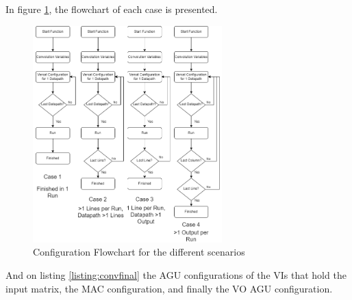 In figure \ref{ConvFlowChart}, the flowchart of each case is presented.

\newpage
\begin{figure}[!htbp]
    \centering
    \includegraphics[width=0.65\textwidth]{Figures/ConvolutionFlowChart.drawio.png}
    \caption{Configuration Flowchart for the different scenarios}
    \label{ConvFlowChart}
\end{figure} 

And on listing \ref{listing:convfinal} the AGU configurations of the VIs that hold the input matrix, the MAC configuration, and finally
the VO AGU configuration.




